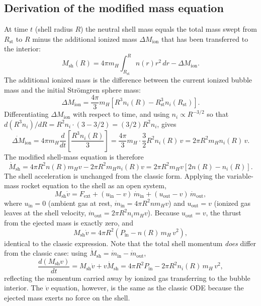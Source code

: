 \documentclass[12pt]{article}
\begin{document}
\subsection{Derivation of the modified mass equation}

At time $t$ (shell radius $R$) the neutral shell mass equals the total mass
swept from $R_\mathrm{st}$ to $R$ minus the additional ionized mass
$\Delta M_\mathrm{ion}$ that has been transferred to the interior:
\begin{equation}
  M_\mathrm{sh}(R) = 4\pi m_H\int_{R_\mathrm{st}}^R n(r)r^2\,dr
    - \Delta M_\mathrm{ion}.
\end{equation}
The additional ionized mass is the difference between the current ionized
bubble mass and the initial Str\"omgren sphere mass:
\begin{equation}
  \Delta M_\mathrm{ion} = \frac{4\pi}{3}m_H
    \!\left[R^3 n_i(R) - R_\mathrm{st}^3 n_i(R_\mathrm{st})\right].
\end{equation}
Differentiating $\Delta M_\mathrm{ion}$ with respect to time, and using
$n_i \propto R^{-3/2}$ so that
$d(R^3 n_i)/dR = R^2 n_i \cdot (3 - 3/2) = (3/2)R^2 n_i$, gives
\begin{equation}
  \dot{\Delta M}_\mathrm{ion}
    = 4\pi m_H \frac{d}{dt}\!\left[\frac{R^3 n_i(R)}{3}\right]
    = \frac{4\pi}{3} m_H \cdot \frac{3}{2} R^2 n_i(R)\,v
    = 2\pi R^2 m_H n_i(R)\,v.
\end{equation}
The modified shell-mass equation is therefore
\begin{equation}
  \label{eq:dMsh_mod}
  \dot{M}_\mathrm{sh}
    = 4\pi R^2 n(R) m_H v - 2\pi R^2 m_H n_i(R) v
    = 2\pi R^2 m_H v\!\left[2n(R) - n_i(R)\right].
\end{equation}
The shell acceleration is unchanged from the classic form.  Applying the
variable-mass rocket equation to the shell as an open system,
\begin{equation}
  \label{eq:rocket}
  M_\mathrm{sh}\dot{v}
    = F_\mathrm{ext}
    + (u_\mathrm{in}-v)\,\dot{m}_\mathrm{in}
    + (u_\mathrm{out}-v)\,\dot{m}_\mathrm{out},
\end{equation}
where $u_\mathrm{in}=0$ (ambient gas at rest, $\dot{m}_\mathrm{in}=4\pi
R^2 n m_H v$) and $u_\mathrm{out}=v$ (ionized gas leaves at the shell
velocity, $\dot{m}_\mathrm{out}=2\pi R^2 n_i m_H v$).  Because
$u_\mathrm{out}=v$, the thrust from the ejected mass is exactly zero, and
\begin{equation}
  M_\mathrm{sh}\dot{v} = 4\pi R^2\!\left(P_\mathrm{in} - n(R)\,m_H\,v^2\right),
\end{equation}
identical to the classic expression.  Note that the total shell momentum
\emph{does} differ from the classic case: using $\dot{M}_\mathrm{sh} =
\dot{m}_\mathrm{in}-\dot{m}_\mathrm{out}$,
\begin{equation}
  \frac{d(M_\mathrm{sh}v)}{dt}
    = M_\mathrm{sh}\dot{v} + v\dot{M}_\mathrm{sh}
    = 4\pi R^2 P_\mathrm{in} - 2\pi R^2 n_i(R)\,m_H\,v^2,
\end{equation}
reflecting the momentum carried away by ionized gas transferring to the bubble
interior.  The $\dot{v}$ equation, however, is the same as the classic ODE
because the ejected mass exerts no force on the shell.
\end{document}
